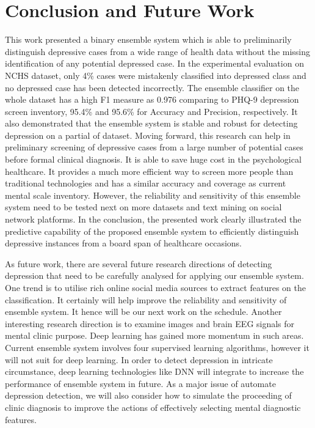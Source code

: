 \documentclass[10pt,journal,compsoc]{IEEEtran}
\begin{document}
\section{Conclusion and Future Work}
This work presented a binary ensemble system which is able to preliminarily distinguish depressive cases from a wide range of health data without the missing identification of any potential depressed case. In the experimental evaluation on NCHS dataset, only 4\% cases were mistakenly classified into depressed class and no depressed case has been detected incorrectly. The ensemble classifier on the whole dataset has a high F1 measure as 0.976 comparing to PHQ-9 depression screen inventory, 95.4\% and 95.6\% for Accuracy and Precision, respectively. It also demonstrated that the ensemble system is stable and robust for detecting depression on a partial of dataset. Moving forward, this research can help in preliminary screening of depressive cases from a large number of potential cases before formal clinical diagnosis. It is able to save huge cost in the psychological healthcare. It provides a much more efficient way to screen more people than traditional technologies and has a similar accuracy and coverage as current mental scale inventory. However, the reliability and sensitivity of this ensemble system need to be tested next on more datasets and text mining on social network platforms. In the conclusion, the presented work clearly illustrated the predictive capability of the proposed ensemble system to efficiently distinguish depressive instances from a board span of healthcare occasions.

As future work, there are several future research directions of detecting depression that need to be carefully analysed for applying our ensemble system. One trend is to utilise rich online social media sources to extract features on the classification. It certainly will help improve the reliability and sensitivity of ensemble system. It hence will be our next work on the schedule.  Another interesting research direction is to examine images and brain EEG signals for mental clinic purpose. Deep learning has gained more momentum in such areas. Current ensemble system involves four supervised learning algorithms, however it will not suit for deep learning. In order to detect depression in intricate circumstance, deep learning technologies like DNN will integrate to increase the performance of ensemble system in future. As a major issue of automate depression detection, we will also consider how to simulate the proceeding of clinic diagnosis to improve the actions of effectively selecting mental diagnostic features. 
\end{document}
